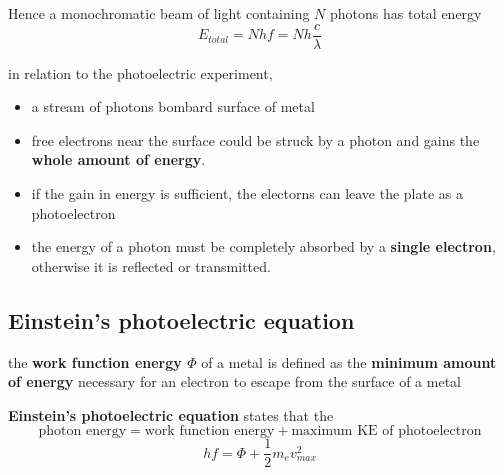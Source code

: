 \documentclass[a4paper, 10pt]{article}
\begin{document}
Hence a monochromatic beam of light containing $N$ photons has total energy
\[
   E_{total} = Nhf = Nh \frac{c}{\lambda}
\]

in relation to the photoelectric experiment, 
\begin{itemize}
   \item a stream of photons bombard surface of metal
   \item free electrons near the surface could be struck by a photon and gains the \textbf{whole amount of energy}. 
   \item if the gain in energy is sufficient, the electorns can leave the plate as a photoelectron
   \item the energy of a photon must be completely absorbed by a \textbf{single electron}, otherwise it is reflected or transmitted. 
\end{itemize}	

\subsection{Einstein's photoelectric equation}
\begin{framed}
   the \textbf{work function energy $\Phi$} of a metal is defined as the \textbf{minimum amount of energy} necessary for an electron to escape from the surface of a metal
\end{framed}	

\begin{framed}
   \textbf{Einstein's photoelectric equation} states that the 
   \[
      \text{photon energy} = \text{work function energy} + \text{maximum KE of photoelectron}
   \]
   \[
      hf = \Phi + \frac{1}{2} m_e v_{max}^2
   \]
\end{framed}	
\end{document}
